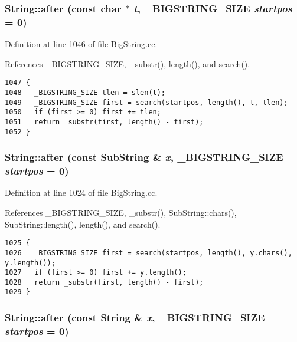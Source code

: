 \subsubsection{ String::after (const char $\ast$ {\em t}, {\bf \_\-BIGSTRING\_\-SIZE} {\em startpos} = 0)}\label{classString_a79}




Definition at line 1046 of file Big\-String.cc.

References \_\-BIGSTRING\_\-SIZE, \_\-substr(), length(), and search().



\footnotesize\begin{verbatim}1047 {
1048   _BIGSTRING_SIZE tlen = slen(t);
1049   _BIGSTRING_SIZE first = search(startpos, length(), t, tlen);
1050   if (first >= 0) first += tlen;
1051   return _substr(first, length() - first);
1052 }
\end{verbatim}\normalsize 
{}
\subsubsection{ String::after (const {\bf Sub\-String} \& {\em x}, {\bf \_\-BIGSTRING\_\-SIZE} {\em startpos} = 0)}\label{classString_a78}




Definition at line 1024 of file Big\-String.cc.

References \_\-BIGSTRING\_\-SIZE, \_\-substr(), Sub\-String::chars(), Sub\-String::length(), length(), and search().



\footnotesize\begin{verbatim}1025 {
1026   _BIGSTRING_SIZE first = search(startpos, length(), y.chars(), y.length());
1027   if (first >= 0) first += y.length();
1028   return _substr(first, length() - first);
1029 }
\end{verbatim}\normalsize 
{}
\subsubsection{ String::after (const String \& {\em x}, {\bf \_\-BIGSTRING\_\-SIZE} {\em startpos} = 0)}\label{classString_a77}





